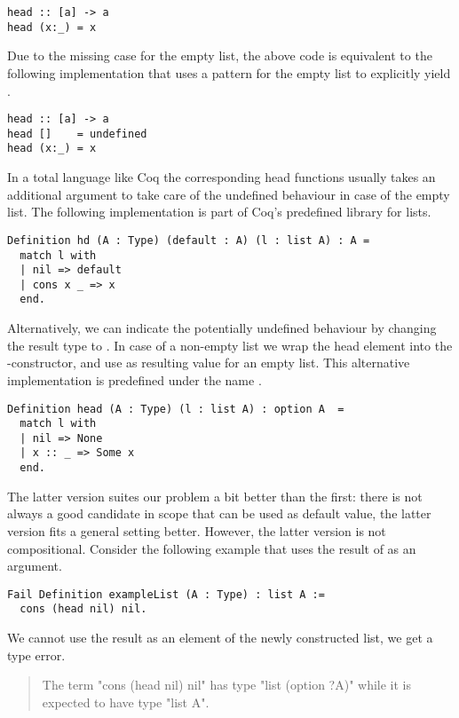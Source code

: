 \begin{verbatim}
head :: [a] -> a
head (x:_) = x
\end{verbatim}

\noindent 
Due to the missing case for the empty list, the above code is
equivalent to the following implementation that uses a pattern for the
empty list to explicitly yield .

\begin{verbatim}
head :: [a] -> a
head []    = undefined
head (x:_) = x
\end{verbatim}

In a total language like Coq the corresponding head functions usually
takes an additional argument to take care of the undefined behaviour
in case of the empty list.
The following implementation is part of Coq's predefined library for
lists.

\begin{verbatim}
Definition hd (A : Type) (default : A) (l : list A) : A = 
  match l with
  | nil => default
  | cons x _ => x
  end.
\end{verbatim}

Alternatively, we can indicate the potentially undefined behaviour by
changing the result type to .
In case of a non-empty list we wrap the head element into the
-constructor, and use  as
resulting value for an empty list.
This alternative implementation is predefined under the name
.

\begin{verbatim}
Definition head (A : Type) (l : list A) : option A  = 
  match l with
  | nil => None
  | x :: _ => Some x
  end.
\end{verbatim}

The latter version suites our problem a bit better than the first:
there is not always a good candidate in scope that can be used as
default value, the latter version fits a general setting better.
However, the latter version is not compositional.
Consider the following example that uses the result of
 as an argument.

\begin{verbatim}
Fail Definition exampleList (A : Type) : list A :=
  cons (head nil) nil.
\end{verbatim}

We cannot use the result as an element of the newly constructed list,
we get a type error.

\begin{quote}
The term "cons (head nil) nil" has type "list (option ?A)" while it is expected to have type "list A".
\end{quote}

